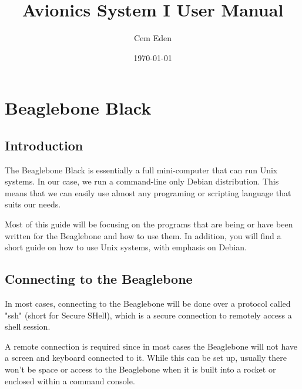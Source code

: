 \documentclass[12pt,article]{memoir}
\title{Avionics System I User Manual}
\author{Cem Eden}
\date{\today}
\begin{document}
	


\tableofcontents*
\clearpage


\chapter{Beaglebone Black}
\section{Introduction}
The Beaglebone Black is essentially a full mini-computer that can run Unix systems. In our case, we run a command-line only Debian distribution. This means that we can easily use almost any programing or scripting language that suits our needs.\par
Most of this guide will be focusing on the programs that are being or have been written for the Beaglebone and how to use them. In addition, you will find a short guide on how to use Unix systems, with emphasis on Debian.\par

\section{Connecting to the Beaglebone}
In most cases, connecting to the Beaglebone will be done over a protocol called "ssh" (short for Secure SHell), which is a secure connection to remotely access a shell session.\par
A remote connection is required since in most cases the Beaglebone will not have a screen and keyboard connected to it. While this can be set up, usually there won’t be space or access to the Beaglebone when it is built into a rocket or enclosed within a command console.
\end{document}
